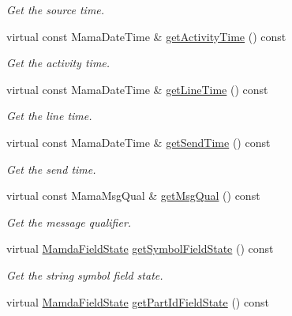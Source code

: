 \begin{CompactItemize}
\begin{CompactList}\small\item\em Get the source time. \item\end{CompactList}\item 
virtual const Mama\-Date\-Time \& \hyperlink{classWombat_1_1MamdaOrderBookConcreteComplexDelta_92fbba5b38824d35c83df4f7c4d3c988}{get\-Activity\-Time} () const 
\begin{CompactList}\small\item\em Get the activity time. \item\end{CompactList}\item 
virtual const Mama\-Date\-Time \& \hyperlink{classWombat_1_1MamdaOrderBookConcreteComplexDelta_e3492571a52dbdbfd47f21da84a38c33}{get\-Line\-Time} () const 
\begin{CompactList}\small\item\em Get the line time. \item\end{CompactList}\item 
virtual const Mama\-Date\-Time \& \hyperlink{classWombat_1_1MamdaOrderBookConcreteComplexDelta_5465c0fc1945d5e28f17972ed12f2bbb}{get\-Send\-Time} () const 
\begin{CompactList}\small\item\em Get the send time. \item\end{CompactList}\item 
virtual const Mama\-Msg\-Qual \& \hyperlink{classWombat_1_1MamdaOrderBookConcreteComplexDelta_7178498a137a11a1a3631cdd82d40c5a}{get\-Msg\-Qual} () const 
\begin{CompactList}\small\item\em Get the message qualifier. \item\end{CompactList}\item 
virtual \hyperlink{namespaceWombat_93aac974f2ab713554fd12a1fa3b7d2a}{Mamda\-Field\-State} \hyperlink{classWombat_1_1MamdaOrderBookConcreteComplexDelta_a7d88a2ded807a8f7a6f951cda7f0632}{get\-Symbol\-Field\-State} () const 
\begin{CompactList}\small\item\em Get the string symbol field state. \item\end{CompactList}\item 
virtual \hyperlink{namespaceWombat_93aac974f2ab713554fd12a1fa3b7d2a}{Mamda\-Field\-State} \hyperlink{classWombat_1_1MamdaOrderBookConcreteComplexDelta_42ee7ffbc3efc20b27e6d2c8bd608be3}{get\-Part\-Id\-Field\-State} () const 

\end{CompactItemize}
